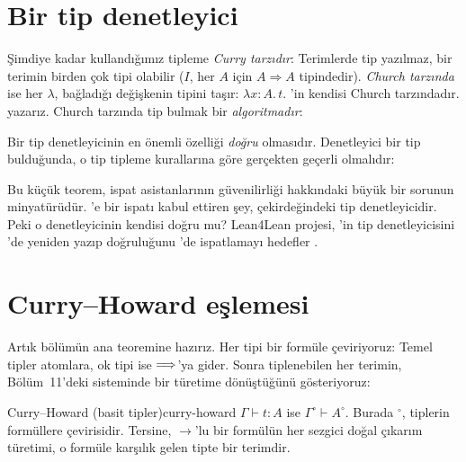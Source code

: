 \section{Bir tip denetleyici}\label{sec:tip-denetleyici}

Şimdiye kadar kullandığımız tipleme \emph{Curry tarzıdır}: Terimlerde
tip yazılmaz, bir terimin birden çok tipi olabilir ($I$, her $A$ için
$A \Rightarrow A$ tipindedir). \emph{Church tarzında} ise her $\lambda$,
bağladığı değişkenin tipini taşır: $\lambda x{:}A.\, t$. \Lean{}'in kendisi
Church tarzındadır.   yazarız. Church
tarzında tip bulmak bir \emph{algoritmadır}:


\noindent Bir tip denetleyicinin en önemli özelliği \emph{doğru}
olmasıdır. Denetleyici bir tip bulduğunda, o tip tipleme kurallarına göre
gerçekten geçerli olmalıdır:


\noindent Bu küçük teorem, ispat asistanlarının güvenilirliği hakkındaki
büyük bir sorunun minyatürüdür. \Lean{}'e bir ispatı kabul ettiren şey,
çekirdeğindeki tip denetleyicidir. Peki o denetleyicinin kendisi doğru
mu? Lean4Lean projesi, \Lean{}'in tip denetleyicisini \Lean{}'de yeniden
yazıp doğruluğunu \Lean{}'de ispatlamayı hedefler \citep{carneiro2026}.

\section{Curry--Howard eşlemesi}\label{sec:curry-howard}

Artık bölümün ana teoremine hazırız. Her tipi bir formüle çeviriyoruz:
Temel tipler atomlara, ok tipi ise $\Longrightarrow$'ya gider. Sonra tiplenebilen
her terimin, Bölüm~11'deki  sisteminde bir türetime
dönüştüğünü gösteriyoruz:


\begin{teorem}{Curry--Howard (basit tipler)}{curry-howard}
$\Gamma \vdash t : A$ ise $\Gamma^\circ \vdash A^\circ$. Burada $^\circ$,
tiplerin formüllere çevirisidir. Tersine, $\to$'lu bir formülün her
sezgici doğal çıkarım türetimi, o formüle karşılık gelen tipte bir
terimdir.
\end{teorem}

